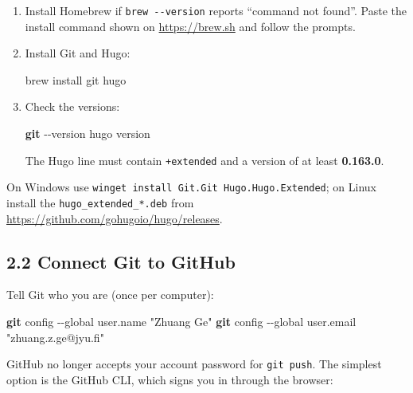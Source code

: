 \documentclass[
  10pt,
]{article}
\newenvironment{Shaded}{\begin{snugshade}}{\end{snugshade}}
\newcommand{\AttributeTok}[1]{\textcolor[rgb]{0.13,0.29,0.53}{#1}}
\newcommand{\ExtensionTok}[1]{#1}
\newcommand{\FunctionTok}[1]{\textcolor[rgb]{0.13,0.29,0.53}{\textbf{#1}}}
\newcommand{\NormalTok}[1]{#1}
\newcommand{\StringTok}[1]{\textcolor[rgb]{0.31,0.60,0.02}{#1}}
\begin{document}
\begin{enumerate}
\def\labelenumi{\arabic{enumi}.}
\item
  Install Homebrew if \texttt{brew\ -\/-version} reports ``command not
  found''. Paste the install command shown on \url{https://brew.sh} and
  follow the prompts.
\item
  Install Git and Hugo:

\begin{Shaded}
\begin{Highlighting}[]
\ExtensionTok{brew}\NormalTok{ install git hugo}
\end{Highlighting}
\end{Shaded}
\item
  Check the versions:

\begin{Shaded}
\begin{Highlighting}[]
\FunctionTok{git} \AttributeTok{{-}{-}version}
\ExtensionTok{hugo}\NormalTok{ version}
\end{Highlighting}
\end{Shaded}

  The Hugo line must contain \texttt{+extended} and a version of at
  least \textbf{0.163.0}.
\end{enumerate}

On Windows use \texttt{winget\ install\ Git.Git\ Hugo.Hugo.Extended}; on
Linux install the \texttt{hugo\_extended\_*.deb} from
\url{https://github.com/gohugoio/hugo/releases}.

\hypertarget{connect-git-to-github}{%
\subsection{2.2 Connect Git to GitHub}\label{connect-git-to-github}}

Tell Git who you are (once per computer):

\begin{Shaded}
\begin{Highlighting}[]
\FunctionTok{git}\NormalTok{ config }\AttributeTok{{-}{-}global}\NormalTok{ user.name  }\StringTok{"Zhuang Ge"}
\FunctionTok{git}\NormalTok{ config }\AttributeTok{{-}{-}global}\NormalTok{ user.email }\StringTok{"zhuang.z.ge@jyu.fi"}
\end{Highlighting}
\end{Shaded}

GitHub no longer accepts your account password for \texttt{git\ push}.
The simplest option is the GitHub CLI, which signs you in through the
browser:
\end{document}

